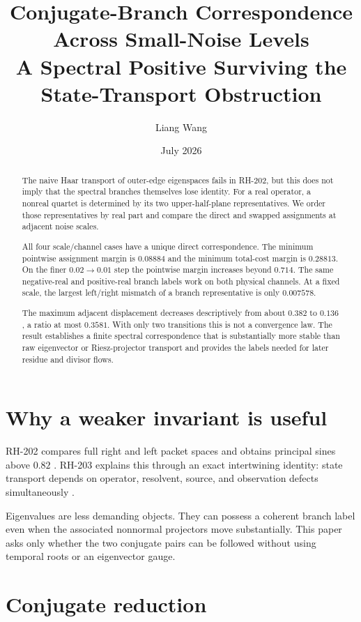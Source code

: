 \documentclass[12pt]{article}
\title{Conjugate-Branch Correspondence Across Small-Noise Levels\\
\large A Spectral Positive Surviving the State-Transport Obstruction}
\author{Liang Wang}\date{July 2026}
\theoremstyle{remark}\newtheorem{remark}[theorem]{Remark}
\begin{document}
\maketitle

\begin{abstract}
The naive Haar transport of outer-edge eigenspaces fails in RH-202, but this
does not imply that the spectral branches themselves lose identity.  For a
real operator, a nonreal quartet is determined by its two upper-half-plane
representatives.  We order those representatives by real part and compare
the direct and swapped assignments at adjacent noise scales.

All four scale/channel cases have a unique direct correspondence.  The
minimum pointwise assignment margin is $0.08884$ and the minimum total-cost
margin is $0.28813$.  On the finer $0.02\to0.01$ step the pointwise margin
increases beyond $0.714$.  The same negative-real and positive-real branch
labels work on both physical channels.  At a fixed scale, the largest
left/right mismatch of a branch representative is only $0.007578$.

The maximum adjacent displacement decreases descriptively from about
$0.382$ to $0.136$, a ratio at most $0.3581$.  With only two transitions this
is not a convergence law.  The result establishes a finite spectral
correspondence that is substantially more stable than raw eigenvector or
Riesz-projector transport and provides the labels needed for later residue
and divisor flows.
\end{abstract}

\section{Why a weaker invariant is useful}

RH-202 compares full right and left packet spaces and obtains principal
sines above $0.82$ \citep{WangRH202}.  RH-203 explains this through an exact
intertwining identity: state transport depends on operator, resolvent,
source, and observation defects simultaneously \citep{WangRH203}.

Eigenvalues are less demanding objects.  They can possess a coherent branch
label even when the associated nonnormal projectors move substantially.
This paper asks only whether the two conjugate pairs can be followed without
using temporal roots or an eigenvector gauge.

\section{Conjugate reduction}
\end{document}
